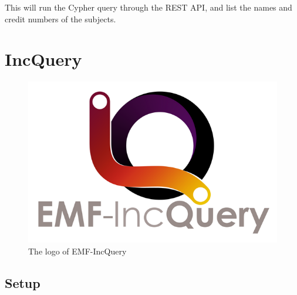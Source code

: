 \documentclass[]{report}
\let\Oldincludegraphics\includegraphics
\renewcommand{\includegraphics}[1]{
\begin{adjustbox}{max size={\textwidth}{\textheight}}
    \Oldincludegraphics[scale=0.6]{#1}%
\end{adjustbox}
}
\begin{document}
This will run the Cypher query through the REST API, and list the names
and credit numbers of the subjects.

\chapter{IncQuery}

\begin{figure}[htbp]
\centering
\includegraphics{img/incquery/logo.png}
\caption{The logo of EMF-IncQuery}
\end{figure}

\section{Setup}
\end{document}
